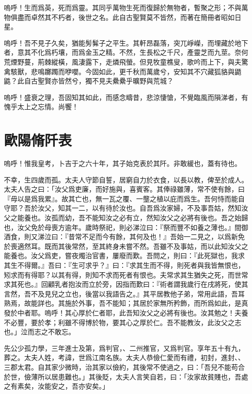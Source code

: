 嗚呼！生而爲英，死而爲靈。其同乎萬物生死而復歸於無物者，暫聚之形；不與萬物俱盡而卓然其不朽者，後世之名。此自古聖賢莫不皆然，而著在簡冊者昭如日星。

嗚呼！吾不見子久矣，猶能髣髴子之平生。其軒昂磊落，突兀崢嶸，而埋藏於地下者，意其不化爲朽壤，而爲金玉之精。不然，生長松之千尺，產靈芝而九莖。奈何荒煙野蔓，荊棘縱橫，風淒露下，走燐飛螢。但見牧童樵叟，歌吟而上下，與夫驚禽駭獸，悲鳴躑躅而咿嚶。今固如此，更千秋而萬歲兮，安知其不穴藏狐貉與鼯鼪？此自古聖賢亦皆然兮，獨不見夫纍纍乎曠野與荒城？

嗚呼！盛衰之理，吾固知其如此，而感念疇昔，悲涼悽愴，不覺臨風而隕涕者，有愧{乎}太上之忘情。尚饗！

\theendnotes 

\section[瀧岡阡表\quad{\small 歐陽脩}]{{\normalsize 歐陽脩}\quad {}阡表}
嗚呼！惟我皇考，卜吉于之六十年，其子始克表於其阡。非敢緩也，蓋有待也。

不幸，生四歲而孤。太夫人守節自誓，居窮自力於衣食，以長以教，俾至於成人。太夫人告之曰：「汝父爲吏廉，而好施與，喜賓客。其俸祿雖薄，常不使有餘，曰『毋以是爲我累』。故其亡也，無一瓦之覆、一壟之植以庇而爲生。吾何恃而能自守耶？吾於汝父，知其一二，以有待於汝也。自吾爲汝家婦，不及事吾姑，然知汝父之能養也。汝孤而幼，吾不能知汝之必有立，然知汝父之必將有後也。吾之始歸也，汝父免於母喪方逾年。歲時祭祀，則必涕泣曰：『祭而豐不如養之薄也。』間御酒食，則又涕泣曰：『昔常不足而今有餘，其何及也！』吾始一二見之，以爲新免於喪適然耳。既而其後常然，至其終身未嘗不然。吾雖不及事姑，而以此知汝父之能養也。汝父爲吏，嘗夜燭治官書，屢廢而歎。吾問之，則曰：『此死獄也，我求其生不得爾。』吾曰：『生可求乎？』曰：『求其生而不得，則死者與我皆無恨也，矧求而有得耶？以其有得，則知不求而死者有恨也。夫常求其生猶失之死，而世常求其死也。』回顧乳者抱汝而立於旁，因指而歎曰：『術者謂我歲行在戌將死，使其言然，吾不及見兒之立也，後當以我語告之。』其平居教他子弟，常用此語，吾耳熟焉，故能詳也。其施於外事，吾不能知；其居於家無所矜飾，而所爲如此，是真發於中者耶。嗚呼！其心厚於仁者耶，此吾知汝父之必將有後也。汝其勉之！夫養不必豐，要於孝；利雖不得博於物，要其心之厚於仁。吾不能教汝，此汝父之志也。」泣而志之不敢忘。

先公少孤力學，三年進士及第，爲判官，、二州推官，又爲判官。享年五十有九，葬之。太夫人姓，考諱，世爲江南名族。太夫人恭儉仁愛而有禮，初封，進封、、三郡太君。自其家少微時，治其家以儉約，其後常不使過之，曰：「吾兒不能苟合於世，儉薄所以居患難也。」其後貶，太夫人言笑自若，曰：「汝家故貧賤也，吾處之有素矣，汝能安之，吾亦安矣。」

